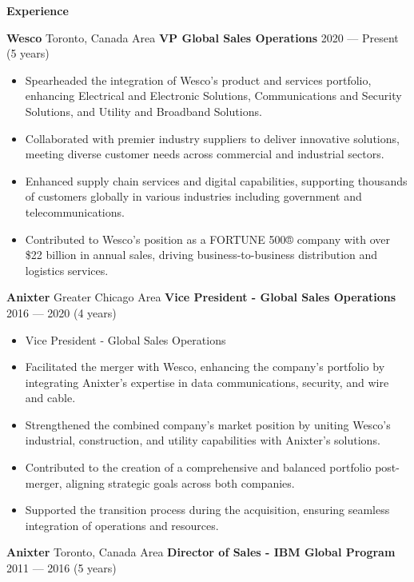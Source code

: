 \documentclass[11pt]{article}
\begin{document}
\begin{center}
    \textbf{Experience}
\end{center}
\textbf{Wesco} \hfill Toronto, Canada Area
\textbf{VP Global Sales Operations} \hfill 2020 — Present (5 years)
\begin{itemize}[noitemsep, topsep=0pt, partopsep=0pt, leftmargin=12pt]
    \item Spearheaded the integration of Wesco's product and services portfolio, enhancing Electrical and Electronic Solutions, Communications and Security Solutions, and Utility and Broadband Solutions.
    \item Collaborated with premier industry suppliers to deliver innovative solutions, meeting diverse customer needs across commercial and industrial sectors.
    \item Enhanced supply chain services and digital capabilities, supporting thousands of customers globally in various industries including government and telecommunications.
    \item Contributed to Wesco's position as a FORTUNE 500® company with over \$22 billion in annual sales, driving business-to-business distribution and logistics services.
\end{itemize}
\vspace{6pt}
\textbf{Anixter} \hfill Greater Chicago Area
\textbf{Vice President - Global Sales Operations} \hfill 2016 — 2020 (4 years)
\begin{itemize}[noitemsep, topsep=0pt, partopsep=0pt, leftmargin=12pt]
    \item Vice President - Global Sales Operations
    \item Facilitated the merger with Wesco, enhancing the company's portfolio by integrating Anixter's expertise in data communications, security, and wire and cable.
    \item Strengthened the combined company's market position by uniting Wesco's industrial, construction, and utility capabilities with Anixter's solutions.
    \item Contributed to the creation of a comprehensive and balanced portfolio post-merger, aligning strategic goals across both companies.
    \item Supported the transition process during the acquisition, ensuring seamless integration of operations and resources.
\end{itemize}
\vspace{6pt}
\textbf{Anixter} \hfill Toronto, Canada Area
\textbf{Director of Sales - IBM Global Program} \hfill 2011 — 2016 (5 years)
\end{document}
